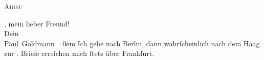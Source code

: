 \begin{ledgroupsized}[t]{13cm}
           \pstart
           \begin{otherlanguage}{french}\textsc{Adieu}\end{otherlanguage}, mein lieber Freund! {\\[\baselineskip]}Dein {\\[\baselineskip]}\spacefill\mbox{Paul Goldmann}\pend
           \leftskip=0em{}\pstart
           \noindent{}Ich gehe nach Berlin, dann wahrſcheinlich nach
                  dem Haag zur \label{K_L02874-65v}\label{K_L02874-65h}.  Briefe erreichen mich ſtets über Frankfurt.\pend
           
         
         \endnumbering{}\end{ledgroupsized}  \newcommand{\dateiname}{L02874}\newcommand{\titel}{Paul Goldmann an Arthur Schnitzler, 1. 5. 1899}\newcommand{\editorInnen}{Martin Anton Müller und Laura Untner}
      